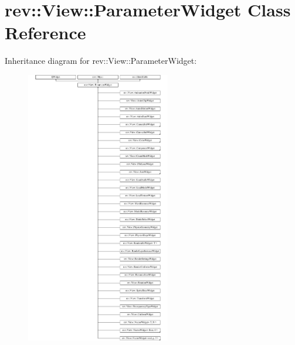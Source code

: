 \hypertarget{classrev_1_1_view_1_1_parameter_widget}{}\section{rev\+::View\+::Parameter\+Widget Class Reference}
\label{classrev_1_1_view_1_1_parameter_widget}
Inheritance diagram for rev\+::View\+::Parameter\+Widget\+:\begin{figure}[H]
\begin{center}
\leavevmode
\includegraphics[height=12.000000cm]{classrev_1_1_view_1_1_parameter_widget}
\end{center}
\end{figure}
